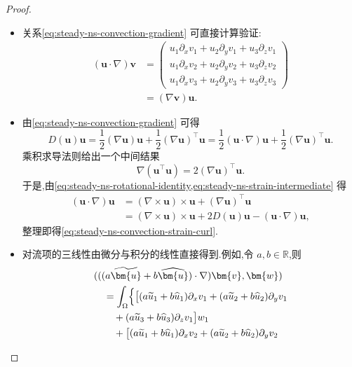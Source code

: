 \begin{proof}
\begin{itemize}
  \item 关系\cref{eq:steady-ns-convection-gradient} 可直接计算验证:
  \[
  \begin{aligned}
    (\bm{u}\cdot\nabla)\bm{v}
    &=\begin{pmatrix}
       u_1\partial_xv_1+u_2\partial_yv_1+u_3\partial_zv_1\\
       u_1\partial_xv_2+u_2\partial_yv_2+u_3\partial_zv_2\\
       u_1\partial_xv_3+u_2\partial_yv_3+u_3\partial_zv_3
      \end{pmatrix}\\
    &=(\nabla\bm{v})\bm{u}.
  \end{aligned}
  \]
  \item 由\cref{eq:steady-ns-convection-gradient} 可得
  \begin{equation}\label{eq:steady-ns-strain-intermediate}
    D(\bm{u})\bm{u}
      =\frac12(\nabla\bm{u})\bm{u}
       +\frac12(\nabla\bm{u})^{\top}\bm{u}
      =\frac12(\bm{u}\cdot\nabla)\bm{u}
       +\frac12(\nabla\bm{u})^{\top}\bm{u}.
  \end{equation}
  乘积求导法则给出一个中间结果
  \[
    \nabla(\bm{u}^{\top}\bm{u})
       =2(\nabla\bm{u})^{\top}\bm{u}.
  \]
  于是,由\cref{eq:steady-ns-rotational-identity,eq:steady-ns-strain-intermediate} 得
  \[
  \begin{aligned}
    (\bm{u}\cdot\nabla)\bm{u}
      &=(\nabla\times\bm{u})\times\bm{u}
        +(\nabla\bm{u})^{\top}\bm{u}\\
      &=(\nabla\times\bm{u})\times\bm{u}
        +2D(\bm{u})\bm{u}-(\bm{u}\cdot\nabla)\bm{u},
  \end{aligned}
  \]
  整理即得\cref{eq:steady-ns-convection-strain-curl}.
  \item 对流项的三线性由微分与积分的线性直接得到.例如,令 $a,b\in\mathbb{R}$,则
  {\small
  \begin{align*}
    &(((a\widetilde{\bm{u}}+b\widehat{\bm{u}})\cdot\nabla)
       \bm{v},\bm{w})\\
    &\quad=\int_\Omega\Bigl\{
      \bigl[(a\widetilde u_1+b\widehat u_1)\partial_xv_1
          +(a\widetilde u_2+b\widehat u_2)\partial_yv_1\\
    &\qquad+(a\widetilde u_3+b\widehat u_3)\partial_zv_1\bigr]w_1\\
    &\qquad+\bigl[(a\widetilde u_1+b\widehat u_1)\partial_xv_2
          +(a\widetilde u_2+b\widehat u_2)\partial_yv_2\\

\end{align*}}
\end{itemize}
\end{proof}
